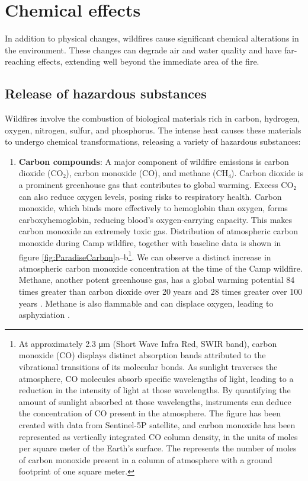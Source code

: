 \documentclass[
  12 pt,
]{Nemilov}
\providecommand{\tightlist}{%
  \setlength{\itemsep}{0pt}\setlength{\parskip}{0pt}}
\begin{document}
\section{Chemical effects}\label{chemical-effects}

In addition to physical changes, wildfires cause significant chemical alterations in the environment. These changes can degrade air and water quality and have far-reaching effects, extending well beyond the immediate area of the fire.

\subsection{Release of hazardous substances}\label{release-of-hazardous-substances}

Wildfires involve the combustion of biological materials rich in carbon, hydrogen, oxygen, nitrogen, sulfur, and phosphorus. The intense heat causes these materials to undergo chemical transformations, releasing a variety of hazardous substances:

\begin{enumerate}
\def\labelenumi{\arabic{enumi}.}
\tightlist
\item
  \textbf{Carbon compounds}: A major component of wildfire emissions is carbon dioxide (CO₂), carbon monoxide (CO), and methane (CH₄). Carbon dioxide is a prominent greenhouse gas that contributes to global warming. Excess CO₂ can also reduce oxygen levels, posing risks to respiratory health. Carbon monoxide, which binds more effectively to hemoglobin than oxygen, forms carboxyhemoglobin, reducing blood's oxygen-carrying capacity. This makes carbon monoxide an extremely toxic gas. Distribution of atmospheric carbon monoxide during Camp wildfire, together with baseline data is shown in figure \ref{fig:ParadiseCarbon}a--b\footnote{At approximately 2.3 μm (Short Wave Infra Red, SWIR band), carbon monoxide (CO) displays distinct absorption bands attributed to the vibrational transitions of its molecular bonds. As sunlight traverses the atmosphere, CO molecules absorb specific wavelengths of light, leading to a reduction in the intensity of light at those wavelengths. By quantifying the amount of sunlight absorbed at those wavelengths, instruments can deduce the concentration of CO present in the atmosphere. The figure has been created with data from Sentinel-5P satellite, and carbon monoxide has been represented as vertically integrated CO column density, in the units of moles per square meter of the Earth's surface. The represents the number of moles of carbon monoxide present in a column of atmosphere with a ground footprint of one square meter.}. We can observe a distinct increase in atmospheric carbon monoxide concentration at the time of the Camp wildfire. Methane, another potent greenhouse gas, has a global warming potential 84 times greater than carbon dioxide over 20 years and 28 times greater over 100 years \citep{skytt2020global}. Methane is also flammable and can displace oxygen, leading to asphyxiation \citep{byard2011issues, byard2023lethal, mcewen2018strangulation, sauvageau2010classification}.
\end{enumerate}
\end{document}
